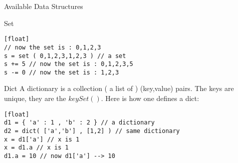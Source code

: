 \begin{section}{Available Data Structures}
\begin{subsection}{Set}
\begin{lstlisting}[style=JexlStyle][float]
// now the set is : 0,1,2,3
s = set ( 0,1,2,3,1,2,3 ) // a set  
s += 5 // now the set is : 0,1,2,3,5 
s -= 0 // now the set is : 1,2,3
\end{lstlisting}
\end{subsection}

\begin{subsection}{Dict}
A dictionary is a collection ( a list of ) (key,value) pairs.
The keys are unique, they are the $keySet()$. Here is how one defines a dict:

\begin{lstlisting}[style=JexlStyle][float]
d1 = { 'a' : 1 , 'b' : 2 } // a dictionary   
d2 = dict( ['a','b'] , [1,2] ) // same dictionary  
x = d1['a'] // x is 1
x = d1.a // x is 1 
d1.a = 10 // now d1['a'] --> 10 
\end{lstlisting}

\end{subsection}

\end{section}

